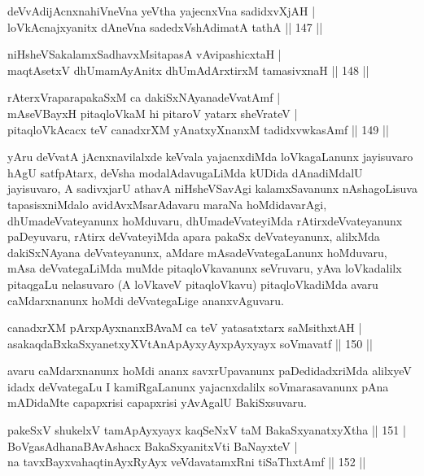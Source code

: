 \begin{shl}
deVvAdijAcnxnahiVneVna yeV\s tha yajecnxVna sadidxvXjAH | \\
loVkAcnajxyanitx dAneVna sadedxVshAdimatA tathA \hfill|| 147 || 
\end{shl}

\begin{shl}
niHsheVSakalamxSadhavxMsitapasA vA\s vipashicxtaH | \\
maqtAsetxV dhUmamAyAnitx dhUmAdArxtirxM tamasivxnaH \hfill|| 148 || 
\end{shl}

\begin{shl}
rAterxVraparapakaSxM ca dakiSxNAyanadeVvatAmf | \\
mAseVBayxH pitaqloVkaM hi pitaroV yatarx sheVrateV | \\
pitaqloVkAcacx teV canadxrXM yAnatxyXnanxM tadidxvwkasAmf \hfill|| 149 || 
\end{shl}

\begin{artha}
yAru deVvatA jAcnxnavilalxde keVvala yajacnxdiMda loVkagaLanunx
jayisuvaro hAgU satfpAtarx, deVsha modalAdavugaLiMda kUDida
dAnadiMdalU jayisuvaro, A sadivxjarU athavA niHsheVSavAgi
kalamxSavanunx nAshagoLisuva tapasisxniMdalo avidAvxMsarAdavaru maraNa
hoMdidavarAgi, dhUmadeVvateyanunx hoMduvaru, dhUmadeVvateyiMda
rAtirxdeVvateyanunx paDeyuvaru, rAtirx deVvateyiMda apara pakaSx
deVvateyanunx, alilxMda dakiSxNAyana deVvateyanunx, aMdare
mAsadeVvategaLanunx hoMduvaru, mAsa deVvategaLiMda muMde
pitaqloVkavanunx seVruvaru, yAva loVkadalilx pitaqgaLu nelasuvaro
(A loVkaveV pitaqloVkavu) pitaqloVkadiMda avaru caMdarxnanunx hoMdi
deVvategaLige ananxvAguvaru.
\end{artha}


\begin{shl}
canadxrXM pArxpAyxnanxBAvaM ca teV yatasatxtarx saMsithxtAH | \\
asakaqdaBxkaSxyanetxyXVtAnApAyxyAyx\s \s pAyxyayx soVmavatf \hfill|| 150 || 
\end{shl}

\begin{artha}
avaru caMdarxnanunx hoMdi ananx savxrUpavanunx paDedidadxriMda
alilxyeV idadx deVvategaLu I kamiRgaLanunx yajacnxdalilx
soVmarasavanunx pAna mADidaMte capapxrisi capapxrisi yAvAgalU
BakiSxsuvaru.
\end{artha}

\begin{shl}
pakeSxV shukelxV tamApAyxyayx kaqSeNxV taM BakaSxyanatxyXtha \hfill|| 151 | \\
BoVgasAdhanaBAvAshacx BakaSxyanitxVti BaNayxteV | \\
na tavxBayxvahaqtinAyxRyAyx veVdavatamxRni tiSaThxtAmf \hfill|| 152 || 
\end{shl}

